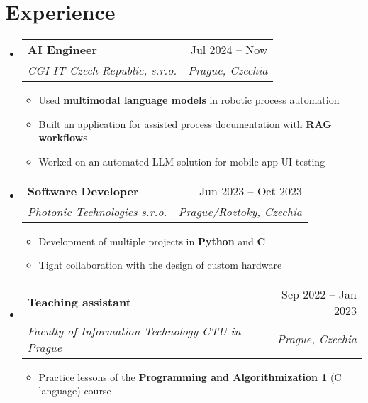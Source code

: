 \documentclass[a4paper,11pt]{article}
\makeatletter
\newcommand{\resumeItem}[1]{
  \item\small{#1}
}
\newcommand{\resumeItemListStart}{\begin{itemize}[rightmargin=0.11in]}
\newcommand{\resumeItemListEnd}{\end{itemize}}
\newcommand{\resumeQuadHeading}[4]{
  \item
  \begin{tabular*}{0.96\textwidth}[t]{l@{\extracolsep{\fill}}r}
    \textbf{#1} & #2 \\
    \textit{\small#3} & \textit{\small #4} \\
  \end{tabular*}
}
\newcommand{\resumeHeadingListStart}{
  \begin{itemize}[leftmargin=0.15in, label={}]
}
\newcommand{\resumeHeadingListEnd}{\end{itemize}}
\makeatother
\begin{document}

\section{Experience}
\resumeHeadingListStart{}

\resumeQuadHeading{AI Engineer}{Jul 2024 -- Now}
{CGI IT Czech Republic, s.r.o.}{Prague, Czechia}
  \resumeItemListStart{}
    \resumeItem{Used \textbf{multimodal language models} in robotic process automation}
    \resumeItem{Built an application for assisted process documentation with \textbf{RAG workflows}}
    \resumeItem{Worked on an automated LLM solution for mobile app UI testing}
  \resumeItemListEnd{}

\resumeQuadHeading{Software Developer}{Jun 2023 -- Oct 2023}
{Photonic Technologies s.r.o.}{Prague/Roztoky, Czechia}
  \resumeItemListStart{}
    \resumeItem{Development of multiple projects in \textbf{Python} and \textbf{C}}
    \resumeItem{Tight collaboration with the design of custom hardware}
  \resumeItemListEnd{}

\resumeQuadHeading{Teaching assistant}{Sep 2022 -- Jan 2023}
{Faculty of Information Technology CTU in Prague}{Prague, Czechia}
  \resumeItemListStart{}
    \resumeItem{Practice lessons of the \textbf{Programming and Algorithmization 1} (C language) course}
  \resumeItemListEnd{}


\resumeHeadingListEnd{}

\end{document}
